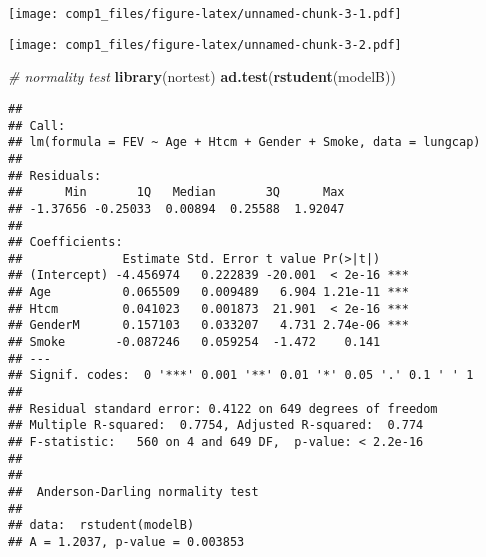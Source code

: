 \documentclass[]{article}
\newenvironment{Shaded}{\begin{snugshade}}{\end{snugshade}}
\newcommand{\KeywordTok}[1]{\textcolor[rgb]{0.13,0.29,0.53}{\textbf{#1}}}
\newcommand{\DataTypeTok}[1]{\textcolor[rgb]{0.13,0.29,0.53}{#1}}
\newcommand{\DecValTok}[1]{\textcolor[rgb]{0.00,0.00,0.81}{#1}}
\newcommand{\StringTok}[1]{\textcolor[rgb]{0.31,0.60,0.02}{#1}}
\newcommand{\CommentTok}[1]{\textcolor[rgb]{0.56,0.35,0.01}{\textit{#1}}}
\newcommand{\OperatorTok}[1]{\textcolor[rgb]{0.81,0.36,0.00}{\textbf{#1}}}
\newcommand{\NormalTok}[1]{#1}
\begin{document}
\texttt{[image: comp1\_files/figure-latex/unnamed-chunk-3-1.pdf]}

\begin{Shaded}
\end{Shaded}

\texttt{[image: comp1\_files/figure-latex/unnamed-chunk-3-2.pdf]}

\begin{Shaded}
\begin{Highlighting}[]
\CommentTok{# normality test}
\KeywordTok{library}\NormalTok{(nortest) }
\KeywordTok{ad.test}\NormalTok{(}\KeywordTok{rstudent}\NormalTok{(modelB))}
\end{Highlighting}
\end{Shaded}

\begin{verbatim}
## 
## Call:
## lm(formula = FEV ~ Age + Htcm + Gender + Smoke, data = lungcap)
## 
## Residuals:
##      Min       1Q   Median       3Q      Max 
## -1.37656 -0.25033  0.00894  0.25588  1.92047 
## 
## Coefficients:
##              Estimate Std. Error t value Pr(>|t|)    
## (Intercept) -4.456974   0.222839 -20.001  < 2e-16 ***
## Age          0.065509   0.009489   6.904 1.21e-11 ***
## Htcm         0.041023   0.001873  21.901  < 2e-16 ***
## GenderM      0.157103   0.033207   4.731 2.74e-06 ***
## Smoke       -0.087246   0.059254  -1.472    0.141    
## ---
## Signif. codes:  0 '***' 0.001 '**' 0.01 '*' 0.05 '.' 0.1 ' ' 1
## 
## Residual standard error: 0.4122 on 649 degrees of freedom
## Multiple R-squared:  0.7754, Adjusted R-squared:  0.774 
## F-statistic:   560 on 4 and 649 DF,  p-value: < 2.2e-16
## 
## 
##  Anderson-Darling normality test
## 
## data:  rstudent(modelB)
## A = 1.2037, p-value = 0.003853
\end{verbatim}
\end{document}
